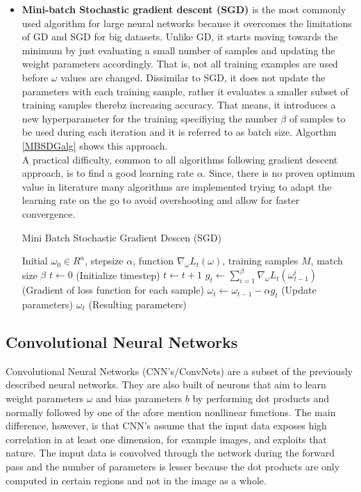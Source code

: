 \begin{itemize}
\item \textbf{Mini-batch Stochastic gradient descent (SGD)} is the most commonly used algorithm for large neural networks because it overcomes the limitations of GD and SGD for big datasets. Unlike GD, it starts moving towards the minimum by just evaluating a small number of samples and updating the weight parameters accordingly. That is, not all training examples are used before $\omega$ values are changed. Dissimilar to SGD, it does not update the parameters with each training sample, rather it evaluates a smaller subset of training samples therebz increasing accuracy. That means, it introduces a new hyperparameter for the training specifiying the number $\beta$ of samples to be used during each iteration and it is referred to as batch size. Algorthm \ref{MBSDGalg} shows this approach. \\
A practical difficulty, common to all algorithms following gradient descent approach, is to find a good learning rate $\alpha$. Since, there is no proven optimum value in literature many algorithms are implemented trying to adapt the learning rate on the go to avoid overshooting and allow for faster convergence.   

\begin{algorithm}
\caption{Mini Batch Stochastic Gradient Descen (SGD)}
\label{MBSDGalg}
\begin{algorithmic}[1]
    \Require Initial $ \omega_0 \in R^n $, stepsize $\alpha  $, function $\nabla_{\omega} L_t ( \omega )$, training samples $M$, match size $\beta$
    \State $t \leftarrow 0$ (Initialize timestep)
    \State $t \leftarrow t+1$
    \State $ g_t \leftarrow \sum_{i=1}^{\beta} \nabla_{\omega} L_t ( \omega_{t-1}^{i} )$ (Gradient of loss function for each sample) 
    \State $\omega_t \leftarrow \omega_{t-1} - \alpha g_t $ (Update parameters)
        \EndFor
    \EndWhile
    \State \Return $\omega_t $ (Resulting parameters)   
\end{algorithmic}
\end{algorithm}     

\end{itemize} 

\FloatBarrier

\subsection{Convolutional Neural Networks}
Convolutional Neural Networks (CNN's/ConvNets) are a subset of the previously described neural networks. They are also built of neurons that aim to learn weight parameters $\omega$ and bias parameters $b$ by performing dot products and normally followed by one of the afore mention nonllinear functions. The main difference, however, is that CNN's assume that the input data exposes high correlation in at least one dimension, for example images, and exploits that nature. The imput data is convolved through the network during the forward pass and the number of parameters is lesser because the dot products are only computed in certain regions and not in the image as a whole.   


